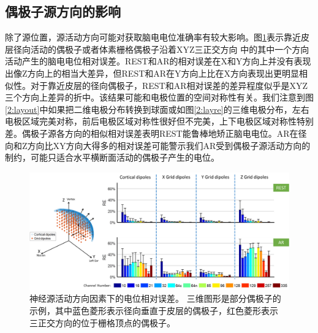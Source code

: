 \subsection{偶极子源方向的影响}
除了源位置，源活动方向可能对获取脑电电位准确率有较大影响。图\ref{2:orie}表示靠近皮层径向活动的偶极子或者体素栅格偶极子沿着XYZ三正交方向
中的其中一个方向活动产生的脑电电位相对误差。REST和AR的相对误差在X和Y方向上并没有表现出像Z方向上的相当大差异，但REST和AR在Y方向上比在X方向表现出更明显相似性。对于靠近皮层的径向偶极子，REST和AR相对误差的差异程度似乎是XYZ三个方向上差异的折中。该结果可能和电极位置的空间对称性有关。我们注意到图\ref{2:layout}中如果把二维电极分布转换到球面或如图\ref{2:layre}的三维电极分布，左右电极区域完美对称，前后电极区域对称性很好但不完美，上下电极区域对称性特别差。偶极子源各方向的相似相对误差表明REST能鲁棒地矫正脑电电位。AR在径向和Z方向比XY方向大得多的相对误差可能警示我们AR受到偶极子源活动方向的制约，可能只适合水平横断面活动的偶极子产生的电位。
\begin{figure}[h!]
	\centering
	\includegraphics[width=15cm]{pic/JNE/figure7.png}
	\caption{神经源活动方向因素下的电位相对误差。 三维图形是部分偶极子的示例，其中蓝色菱形表示径向垂直于皮层的偶极子，红色菱形表示
	三正交方向的位于栅格顶点的偶极子。}
	\label{2:orie}
\end{figure}


